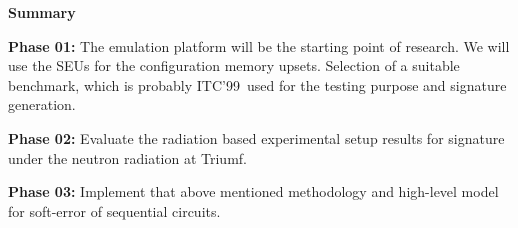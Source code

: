 \textbf{Summary}

\textbf{Phase  01:} The emulation platform will be the starting point of research. We will use the SEUs for the configuration memory upsets. Selection of a suitable benchmark, which is probably ITC'99~\cite{ITC}used for the testing purpose and signature generation.

\textbf{Phase  02:} Evaluate the radiation based experimental setup results for signature under the neutron radiation at Triumf.


\textbf{Phase 03:} Implement that above mentioned methodology and high-level model for soft-error of sequential circuits.


